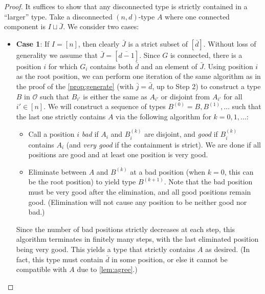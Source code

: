 \documentclass[letterpaper,reqno,11pt]{amsart}
\begin{document}
\begin{proof}
    It suffices to show that any disconnected type is strictly contained in a ``larger'' type. Take a disconnected $(n,d)$-type $A$ where one connected component is $I\sqcup \bar{J}$. We consider two cases: 

    \begin{itemize}
        \item \textbf{Case 1}: If $I = [n]$, then clearly $\bar{J}$ is a strict subset of $[\bar{d}]$. Without loss of generality we assume that $\bar{J} = [\overline{d-1}]$. Since $G$ is connected, there is a position $i$ for which $G_i$ contains both $\bar{d}$ and an element of $\bar{J}$. Using position $i$ as the root position, we can perform one iteration of the same algorithm as in the proof of the \cref{prop:generate} (with $\bar{j} = \bar{d}$, up to Step 2) to construct a type $B$ in $\mathcal{O}$ such that $B_{i'}$ is either the same as $A_{i'}$ or disjoint from $A_{i'}$ for all $i'\in [n]$. We will construct a sequence of types $B^{(0)} = B, B^{(1)}, \dots$ such that the last one strictly contains $A$ via the following algorithm for $k = 0, 1, \dots$: \begin{itemize}
            \item Call a position $i$ \emph{bad} if $A_i$ and $B^{(k)}_i$ are disjoint, and \emph{good} if $B^{(k)}_i$ contains $A_i$ (and \emph{very good} if the containment is strict). We are done if all positions are good and at least one position is very good.
            \item Eliminate between $A$ and $B^{(k)}$ at a bad position (when $k = 0$, this can be the root position) to yield type $B^{(k+1)}$. Note that the bad position must be very good after the elimination, and all good positions remain good. (Elimination will not cause any position to be neither good nor bad.)
        \end{itemize}
        Since the number of bad positions strictly decreases at each step, this algorithm terminates in finitely many steps, with the last eliminated position being very good. This yields a type that strictly contains $A$ as desired. (In fact, this type must contain $\bar{d}$ in some position, or else it cannot be compatible with $A$ due to \cref{lem:agree}.)


\end{itemize}
\end{proof}
\end{document}
